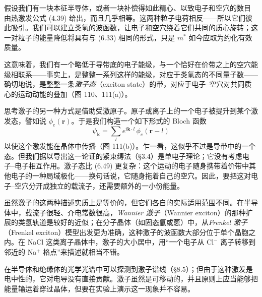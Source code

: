 假设我们有一块本征半导体，或者一块补偿得如此精心、以致电子和空穴的数目
由热激发公式 (4.39) 给出，而且几乎相等。这两种粒子电荷相反——所以它们彼此吸引。我们可以建立类氢的波函数，让电子和空穴绕着它们共同的质心旋转；这一对粒子的能量降低将具有与 (6.33) 相同的形式，只是 $m^{*}$ 如今应取为约化有效质量。


这意味着，我们有一个略低于导带底的电子能级，与一个恰好在价带之上的空穴能级相联系——事实上，是整整一系列这样的能级，对应于类氢态的不同量子数——确切地说，是整整一条\emph{激子态}（exciton state）的带，对应于电子–空穴对共同质心的运动动能的叠加（图 110、111(a)）。

思考激子的另一种方式是借助受激原子。原子或离子上的一个电子被提升到某个激发态，譬如说 $\phi_{e}(\mathbf{r})$。于是我们构造一个如下形式的 Bloch 函数
\begin{equation*}
\psi_{\mathbf{k}}=\sum_{l}e^{i\mathbf{k}\cdot l}\,\phi_{e}(\mathbf{r}-l) \tag{6.49}
\end{equation*}
以使这个激发能在晶体中传播（图 111(b)）。乍一看，这似乎不过是导带中的一个态。但我们据以导出这一论证的紧束缚法（§3.4）是单电子理论；它没有考虑电子–电子相互作用。激子态比 (6.49) 更复杂：这个运动的电子随身携带着价带中其他电子的一种局域极化——换句话说，它随身拖着自己的空穴。因此，要把这对电子–空穴分开成独立的载流子，还需要额外的一小份能量。



虽然激子的这两种描述实质上是等价的，但它们各自的实际适用范围不同。在半导体中，载流子很轻、介电常数很高，\emph{Wannier 激子}（Wannier exciton）的那种扩展的类氢轨道是较好的近似；在分子晶体（如固态氩或蒽）中，从\emph{Frenkel 激子}（Frenkel exciton）模型出发更为准确，这种激子的波函数大部分位于单个晶胞之内。在 NaCl 这类离子晶体中，激子的大小居中，用“一个电子从 Cl$^{-}$ 离子转移到邻近的 Na$^{+}$ 格点”来描述就相当不错。

在半导体和绝缘体的光学光谱中可以探测到激子谱线（§8.5）；但由于这种激发是电中性的，它对电导没有直接贡献。激子虽然是可移动的，并且原则上应当能够把能量输运着穿过晶体，但要在实验上演示这一现象并不容易。
